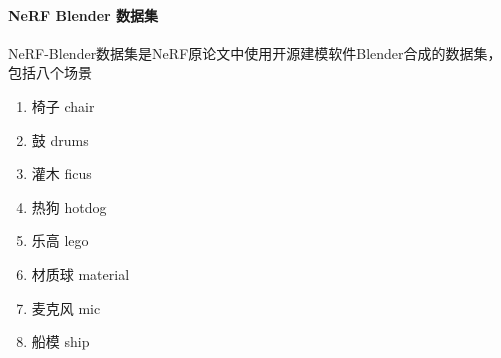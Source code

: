 \paragraph{NeRF Blender 数据集}

NeRF-Blender数据集是NeRF原论文中使用开源建模软件Blender合成的数据集，包括八个场景

\begin{enumerate}
    \item 椅子 chair 
    \item 鼓 drums
    \item 灌木 ficus 
    \item 热狗 hotdog 
    \item 乐高 lego
    \item 材质球 material
    \item 麦克风 mic
    \item 船模 ship 
\end{enumerate}









